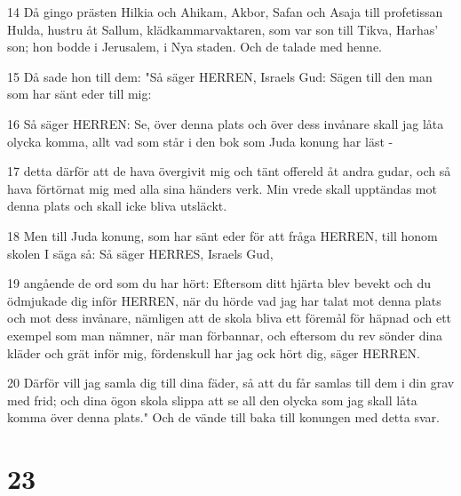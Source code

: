 \par 14 Då gingo prästen Hilkia och Ahikam, Akbor, Safan och Asaja till profetissan Hulda, hustru åt Sallum, klädkammarvaktaren, som var son till Tikva, Harhas' son; hon bodde i Jerusalem, i Nya staden. Och de talade med henne.
\par 15 Då sade hon till dem: "Så säger HERREN, Israels Gud: Sägen till den man som har sänt eder till mig:
\par 16 Så säger HERREN: Se, över denna plats och över dess invånare skall jag låta olycka komma, allt vad som står i den bok som Juda konung har läst -
\par 17 detta därför att de hava övergivit mig och tänt offereld åt andra gudar, och så hava förtörnat mig med alla sina händers verk. Min vrede skall upptändas mot denna plats och skall icke bliva utsläckt.
\par 18 Men till Juda konung, som har sänt eder för att fråga HERREN, till honom skolen I säga så: Så säger HERRES, Israels Gud,
\par 19 angående de ord som du har hört: Eftersom ditt hjärta blev bevekt och du ödmjukade dig inför HERREN, när du hörde vad jag har talat mot denna plats och mot dess invånare, nämligen att de skola bliva ett föremål för häpnad och ett exempel som man nämner, när man förbannar, och eftersom du rev sönder dina kläder och grät inför mig, fördenskull har jag ock hört dig, säger HERREN.
\par 20 Därför vill jag samla dig till dina fäder, så att du får samlas till dem i din grav med frid; och dina ögon skola slippa att se all den olycka som jag skall låta komma över denna plats." Och de vände till baka till konungen med detta svar.

\chapter{23}

